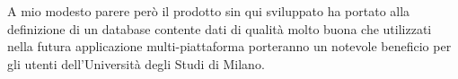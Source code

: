 \documentclass[12pt]{report}
\begin{document}
\vspace{5mm} %

A mio modesto parere però il prodotto sin qui sviluppato ha portato alla definizione di un database contente dati di qualità molto buona che utilizzati nella futura applicazione multi-piattaforma porteranno un notevole beneficio per gli utenti dell'Università degli Studi di Milano.   


%
%

%
%
\nocite{*}
\printbibliography

% 
\end{document}
